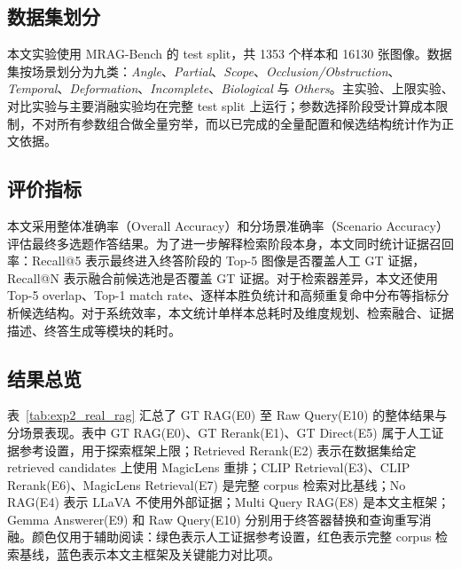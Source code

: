 \subsection{数据集划分}

本文实验使用 MRAG-Bench 的 test split，共 1353 个样本和 16130 张图像。数据集按场景划分为九类：\textit{Angle}、\textit{Partial}、\textit{Scope}、\textit{Occlusion/Obstruction}、\textit{Temporal}、\textit{Deformation}、\textit{Incomplete}、\textit{Biological} 与 \textit{Others}。主实验、上限实验、对比实验与主要消融实验均在完整 test split 上运行；参数选择阶段受计算成本限制，不对所有参数组合做全量穷举，而以已完成的全量配置和候选结构统计作为正文依据。

\subsection{评价指标}

本文采用整体准确率（Overall Accuracy）和分场景准确率（Scenario Accuracy）评估最终多选题作答结果。为了进一步解释检索阶段本身，本文同时统计证据召回率：Recall@5 表示最终进入终答阶段的 Top-5 图像是否覆盖人工 GT 证据，Recall@N 表示融合前候选池是否覆盖 GT 证据。对于检索器差异，本文还使用 Top-5 overlap、Top-1 match rate、逐样本胜负统计和高频重复命中分布等指标分析候选结构。对于系统效率，本文统计单样本总耗时及维度规划、检索融合、证据描述、终答生成等模块的耗时。

\subsection{结果总览}

表~\ref{tab:exp2_real_rag} 汇总了 GT RAG(E0) 至 Raw Query(E10) 的整体结果与分场景表现。表中 GT RAG(E0)、GT Rerank(E1)、GT Direct(E5) 属于人工证据参考设置，用于探索框架上限；Retrieved Rerank(E2) 表示在数据集给定 retrieved candidates 上使用 MagicLens 重排；CLIP Retrieval(E3)、CLIP Rerank(E6)、MagicLens Retrieval(E7) 是完整 corpus 检索对比基线；No RAG(E4) 表示 LLaVA 不使用外部证据；Multi Query RAG(E8) 是本文主框架；Gemma Answerer(E9) 和 Raw Query(E10) 分别用于终答器替换和查询重写消融。颜色仅用于辅助阅读：绿色表示人工证据参考设置，红色表示完整 corpus 检索基线，蓝色表示本文主框架及关键能力对比项。

